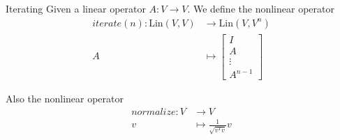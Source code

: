 \documentclass[9pt]{beamer}
\newcommand\Lin{\mathrm{Lin}}   %
\begin{document}


\begin{frame}[fragile]{Iterating}
Given a linear operator $A:V \rightarrow V$. We define the nonlinear operator
\begin{align*}
  iterate(n): \Lin(V,V) &\rightarrow \Lin(V,V^n)    \\
                      A &\mapsto \begin{bmatrix} I \\ A \\ \vdots \\ A^{n-1} \end{bmatrix}
\end{align*}

\pause
Also the nonlinear operator
\begin{align*}
  normalize : V &\rightarrow V    \\
              v &\mapsto  \frac{1}{\sqrt{v^Tv}} v
\end{align*}




\end{frame}
\end{document}
